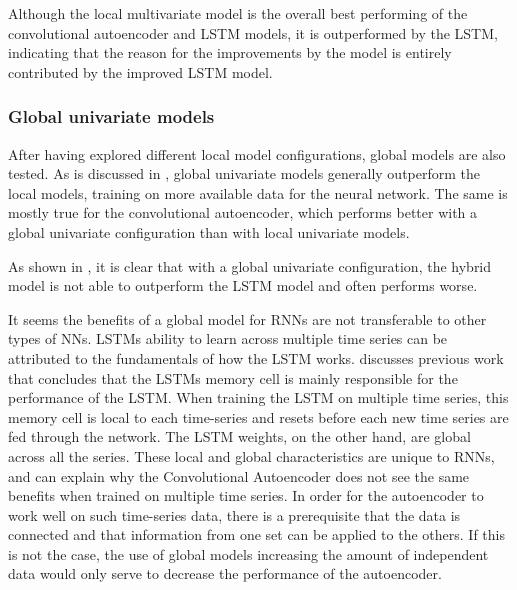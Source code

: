 Although the local multivariate model is the overall best performing of the convolutional autoencoder and LSTM models,
it is outperformed by the LSTM, indicating that the reason for the improvements by the model
is entirely contributed by the improved LSTM model.


\subsubsection{Global univariate models}


After having explored different local model configurations,
global models are also tested.
As is discussed in ,
global univariate models generally outperform the local models, training on more available data for the neural network.
The same is mostly true for the convolutional autoencoder, which performs better with a global univariate configuration than with local univariate models.

As shown in , it is clear that
with a global univariate configuration,
the hybrid model is not able to outperform the LSTM model and often performs worse.


It seems the benefits of a global model for RNNs are not transferable to other types
of NNs. LSTMs ability to learn across multiple time series can be attributed to the fundamentals
of how the LSTM works. \cite{Zhao2019} discusses previous work that concludes that
the LSTMs memory cell is mainly responsible for the performance of the LSTM.
When training the LSTM on multiple time series, this memory cell is local to each
time-series and resets before each new time series are fed through the network.
The LSTM weights, on the other hand, are global across all the series.
These local and global characteristics are unique to RNNs, and can explain
why the Convolutional Autoencoder does not see the same benefits when trained on multiple
time series.
In order for the autoencoder to work well on such time-series data,
there is a prerequisite that the data is connected and that information from one set can be applied to the others.
If this is not the case, the use of global models increasing the amount of independent data would only serve to decrease the performance of the autoencoder.



